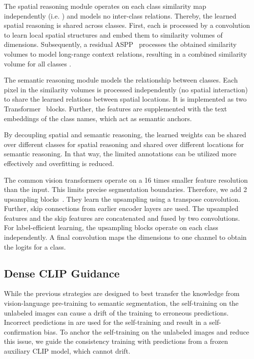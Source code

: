 \documentclass[10pt,twocolumn,letterpaper]{article}
\begin{document}
The spatial reasoning module operates on each class similarity map independently (i.e. ) and models no inter-class relations. Thereby, the learned spatial reasoning is shared across classes.
First, each  is processed by a  convolution to learn local spatial structures and embed them to similarity volumes  of  dimensions. Subsequently, a residual ASPP~\cite{chen2018encoder} processes the obtained similarity volumes to model long-range context relations, resulting in a combined similarity volume for all classes .

The semantic reasoning module models the relationship between classes. Each pixel in the similarity volumes  is processed independently (no spatial interaction) to share the learned relations between spatial locations.
It is implemented as two Transformer~\cite{vaswani2017attention} blocks. Further, the features are supplemented with the  text embeddings of the class names, which act as semantic anchors.

By decoupling spatial and semantic reasoning, the learned weights can be shared over different classes for spatial reasoning and shared over different locations for semantic reasoning. In that way, the limited annotations can be utilized more effectively and overfitting is reduced.

The common vision transformers operate on a 16 times smaller feature resolution than the input. This limits precise segmentation boundaries. Therefore, we add 2 upsampling blocks~\cite{ronneberger2015u}. They learn the upsampling using a transpose convolution. Further, skip connections from earlier encoder layers are used. The upsampled features and the skip features are concatenated and fused by two convolutions. For label-efficient learning, the upsampling blocks operate on each class independently. A final convolution maps the  dimensions to one channel to obtain the logits for a class.

\subsection{Dense CLIP Guidance}
\label{sec:methods_clip_guidance}

While the previous strategies are designed to best transfer the knowledge from vision-language pre-training to semantic segmentation, the self-training on the unlabeled images can cause a drift of the training to erroneous predictions. Incorrect predictions in  are used for the self-training and result in a self-confirmation bias. To anchor the self-training on the unlabeled images and reduce this issue, we guide the consistency training with predictions from a frozen auxiliary CLIP model, which cannot drift.
\end{document}
